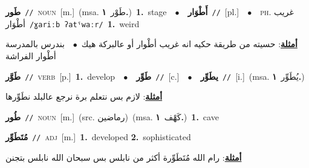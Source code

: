 \documentclass[10pt,a4paper,twoside]{article} %
\begin{document}
\begin{multicols}{2}
{\setlength\topsep{0pt}\textbf{\foreignlanguage{arabic}{طَور}}\ {\color{gray}\texttt{//}\color{black}}\ \textsc{noun}\ [m.]\ \color{gray}(msa. \foreignlanguage{arabic}{طَوْر}~\foreignlanguage{arabic}{\textbf{١.}})\color{black}\ \textbf{1.}~stage\ \ $\bullet$\ \ \setlength\topsep{0pt}\textbf{\foreignlanguage{arabic}{أَطْوَار}}\ {\color{gray}\texttt{//}\color{black}}\ [pl.]\ \ $\bullet$\ \ \textsc{ph.} \color{gray} \foreignlanguage{arabic}{غريب أطْوَار}\color{black}\ {\color{gray}\texttt{/{\sffamily ɣariːb ʔatˤwaːr}/}\color{black}}\ \textbf{1.}~weird\  \begin{flushright}\color{gray}\foreignlanguage{arabic}{\textbf{\underline{\foreignlanguage{arabic}{أمثلة}}}: حسيته من طريقة حكيه انه غريب أطْوار أو عالبركة هيك\ $\bullet$\ \  بندرس بالمدرسة أطْوار الفراشة}\end{flushright}\color{black}} \vspace{2mm}

{\setlength\topsep{0pt}\textbf{\foreignlanguage{arabic}{طَوَّر}}\ {\color{gray}\texttt{//}\color{black}}\ \textsc{verb}\ [p.]\ \textbf{1.}~develop\ \ $\bullet$\ \ \setlength\topsep{0pt}\textbf{\foreignlanguage{arabic}{طَوِّر}}\ {\color{gray}\texttt{//}\color{black}}\ [c.]\ \ $\bullet$\ \ \setlength\topsep{0pt}\textbf{\foreignlanguage{arabic}{يطَوِّر}}\ {\color{gray}\texttt{//}\color{black}}\ [i.]\ \color{gray}(msa. \foreignlanguage{arabic}{يُطَوِّر}~\foreignlanguage{arabic}{\textbf{١.}})\color{black}\  \begin{flushright}\color{gray}\foreignlanguage{arabic}{\textbf{\underline{\foreignlanguage{arabic}{أمثلة}}}: لازم بس نتعلم برة نرجع عالبلد نطَوِّرها}\end{flushright}\color{black}} \vspace{2mm}

{\setlength\topsep{0pt}\textbf{\foreignlanguage{arabic}{طُور}}\ {\color{gray}\texttt{//}\color{black}}\ \textsc{noun}\ [m.]\ (src. \color{gray}\foreignlanguage{arabic}{رماضين}\color{black})\ \color{gray}(msa. \foreignlanguage{arabic}{كَهْف}~\foreignlanguage{arabic}{\textbf{١.}})\color{black}\ \textbf{1.}~cave\ } \vspace{2mm}

{\setlength\topsep{0pt}\textbf{\foreignlanguage{arabic}{مُتَطَوِّر}}\ {\color{gray}\texttt{//}\color{black}}\ \textsc{adj}\ [m.]\ \textbf{1.}~developed  \textbf{2.}~sophisticated\  \begin{flushright}\color{gray}\foreignlanguage{arabic}{\textbf{\underline{\foreignlanguage{arabic}{أمثلة}}}: رام الله مُتَطَوِّرة أكثر من نابلس بس سبحان الله نابلس بتجنن}\end{flushright}\color{black}} \vspace{2mm}


\end{multicols}
\end{document}
